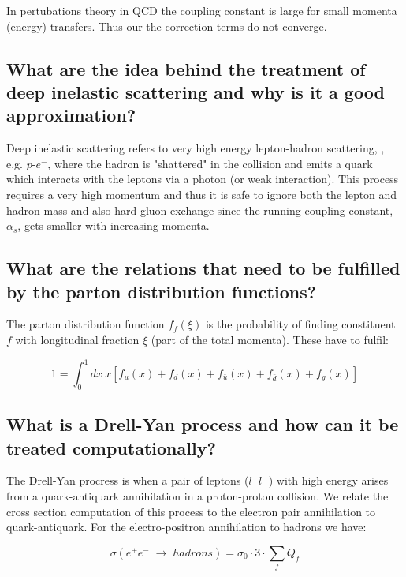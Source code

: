 \documentclass[paper=a4, fontsize=11pt]{scrartcl} %
\numberwithin{equation}{section} %
\numberwithin{figure}{section} %
\numberwithin{table}{section} %
\begin{document}
In pertubations theory in QCD the coupling constant is large for small momenta (energy) transfers. Thus our the correction terms do not converge.

\subsection{What are the idea behind the treatment of deep inelastic scattering and why is it a good approximation?}
Deep inelastic scattering refers to very high energy lepton-hadron scattering, , e.g. $p$-$e^-$, where the hadron is "shattered" in the collision and emits a quark which interacts with the leptons via a photon (or weak interaction). This process requires a very high momentum and thus it is safe to ignore both the lepton and hadron mass and also hard gluon exchange since the running coupling constant, $\bar{\alpha}_s$, gets smaller with increasing momenta.


\subsection{What are the relations that need to be fulfilled by the parton distribution functions?}

The parton distribution function $f_f(\xi)$ is the probability of finding constituent $f$ with longitudinal fraction $\xi$ (part of the total momenta). These have to fulfil:

\begin{equation}
1 = \int_0^1dx~x\left[ f_u(x) + f_d(x) + f_{\bar{u}}(x) + f_{\bar{d}}(x) + f_g(x)\right]
\end{equation}



\subsection{What is a Drell-Yan process and how can it be treated computationally?}

The Drell-Yan procress is when a pair of leptons ($l^+l^-$) with high energy arises from a quark-antiquark annihilation in a proton-proton collision. We relate the cross section computation of this process to the electron pair annihilation to quark-antiquark. For the electro-positron annihilation to hadrons we have:

\begin{equation}
\sigma(e^+e^-\; \rightarrow \; hadrons) = \sigma_0\cdot3\cdot\sum_fQ_f
\end{equation}
\end{document}

